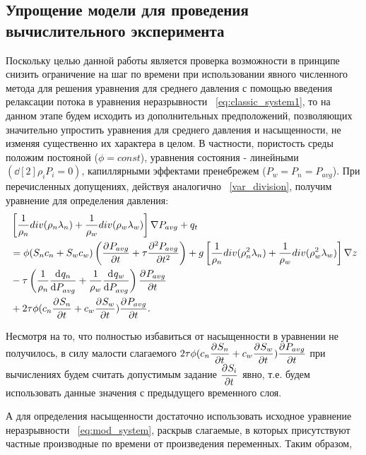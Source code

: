 \subsection{Упрощение модели для проведения вычислительного эксперимента}
\label{model_simplification}

Поскольку целью данной работы является проверка возможности в принципе снизить ограничение на шаг по времени при
использовании явного численного метода для решения уравнения для среднего давления
с помощью введения релаксации потока в уравнения неразрывности ~\eqref{eq:classic_system1}, то на данном этапе
будем исходить из дополнительных предположений, позволяющих значительно упростить уравнения для среднего давления
и насыщенности, не изменяя существенно их характера в целом. В частности, пористость среды положим постояной ($\phi = const$),
уравнения состояния - линейными $\left( \dd[2]{\rho_i}{P_i} = 0 \right)$, капиллярными эффектами пренебрежем ($P_w = P_n = P_{avg}$).
При перечисленных допущениях, действуя аналогично ~\ref{var_division}, получим уравнение для определения давления:
\begin{equation} \label{eq:mod_pressure}
 \begin{aligned}
  &\left[ \frac{1}{\rho_n} div (\rho_n\lambda_n) + \frac{1}{\rho_w} div (\rho_w\lambda_w) \right] \nabla P_{avg}
  + q_t \\
  & = \phi (S_n c_n + S_w c_w) \left( \pd{P_{avg}}{t} + \tau \pd[2]{P_{avg}}{t} \right)
  + g \left[ \frac{1}{\rho_n} div (\rho_n^2\lambda_n) + \frac{1}{\rho_w} div (\rho_w^2\lambda_w) \right] \nabla z \\
  & -  \tau \left(\frac{1}{\rho_n}\dd{q_n}{P_{avg}} + \frac{1}{\rho_w}\dd{q_w}{P_{avg}}\right) \pd{P_{avg}}{t} \\
  & + 2 \tau \phi (c_n \pd{S_n}{t} + c_w\pd{S_w}{t}) \pd{P_{avg}}{t}.
 \end{aligned}
\end{equation}

Несмотря на то, что полностью избавиться от насыщенности в уравнении не получилось, в силу малости слагаемого
$2 \tau \phi (c_n \pd{S_n}{t} + c_w\pd{S_w}{t}) \pd{P_{avg}}{t}$
при вычислениях будем считать допустимым задание $\pd{S_i}{t}$ явно, т.е. будем использовать данные
значения с предыдущего временного слоя.

А для определения насыщенности достаточно использовать исходное уравнение неразрывности ~\eqref{eq:mod_system},
раскрыв слагаемые, в которых присутствуют частные производные по времени от произведения переменных. Таким образом,

